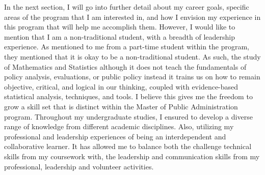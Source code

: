 \documentclass[11pt, a4paper]{awesome-cv}
\begin{document}
\begin{cvletter}
In the next section, I will go into further detail about my career goals, specific areas of the program that I am interested in, and how I envision my experience in this program that will help me accomplish them. However, I would like to mention that I am a non-traditional student, with a breadth of leadership experience. As mentioned to me from a part-time student within the program, they mentioned that it is okay to be a non-traditional student. As such, the study of Mathematics and Statistics although it does not teach the fundamentals of policy analysis, evaluations, or public policy instead it trains us on how to remain objective, critical, and logical in our thinking, coupled with evidence-based statistical analysis, techniques, and tools. I believe this gives me the freedom to grow a skill set that is distinct within the Master of Public Administration program. Throughout my undergraduate studies, I ensured to develop a diverse range of knowledge from different academic disciplines. Also, utilizing my professional and leadership experiences of being an interdependent and collaborative learner. It has allowed me to balance both the challenge technical skills from my coursework with, the leadership and communication skills from my professional, leadership and volunteer activities.


\end{cvletter}


\makeletterclosing
\end{document}
